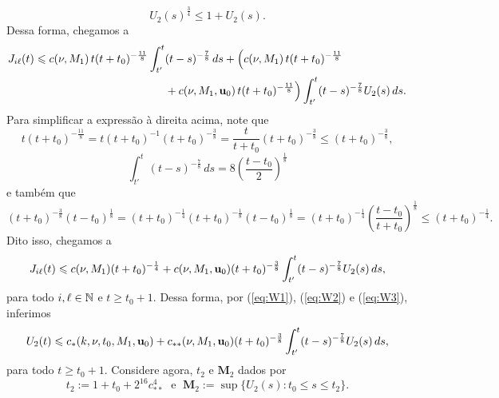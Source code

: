 \begin{prf}
    \begin{equation} \label{eq:youngu2}
        U_2(s)^{\frac{3}{4}} \leqslant 1 + U_2(s).
    \end{equation}
    Dessa forma, chegamos a
    \[
        \begin{aligned}
            J_{i\ell}(t) \leqslant c(\nu, M_1) \,t (t + t_0)^{-\frac{11}{8}} \int_{t'}^t &(t - s)^{-\frac{7}{8}} \,ds + \Big( c(\nu, M_1) \,t (t + t_0)^{-\frac{11}{8}}\\ 
            &+ c(\nu, M_1, \mathbf{u}_0) \, t (t + t_0)^{-\frac{11}{8}} \Big) \int_{t'}^t (t - s)^{-\frac{7}{8}} U_2(s) \,ds.
        \end{aligned}
    \]
    Para simplificar a expressão à direita acima, note que
    \begin{equation} \label{eq:mais1}
         t(t + t_0)^{-\frac{11}{8}} = t(t + t_0)^{-1} (t+t_0)^{-\frac{3}{8}} = \frac{t}{t + t_0} (t + t_0)^{-\frac{3}{8}} \leqslant (t + t_0)^{-\frac{3}{8}},
    \end{equation}
    \begin{equation} \label{eq:mais2}
        \int_{t'}^t (t-s)^{-\frac{7}{8}} \,ds = 8 \left( \frac{t - t_0}{2} \right)^{\frac{1}{8}}
    \end{equation}
    e também que
    \begin{equation} \label{eq:mais3}
        (t + t_0)^{-\frac{3}{8}} (t - t_0)^{\frac{1}{8}} = (t + t_0)^{-\frac{1}{4}} (t + t_0)^{-\frac{1}{8}} (t - t_0)^{\frac{1}{8}} = (t + t_0)^{-\frac{1}{4}} \left( \frac{t - t_0}{t+t_0} \right)^{\frac{1}{8}} \leqslant (t + t_0)^{-\frac{1}{4}}.
    \end{equation}
    Dito isso, chegamos a
    \begin{equation} \label{eq:W3}
        J_{i\ell}(t) \leqslant c(\nu, M_1) (t + t_0)^{-\frac{1}{4}} + c(\nu,M_1, \mathbf{u}_0) (t+t_0)^{-\frac{3}{8}} \int_{t'}^t (t - s)^{-\frac{7}{8}} U_2(s)\,ds,
    \end{equation}
    para todo $i, \ell \in \mathbb{N}$ e $t \geqslant t_0 + 1$. Dessa forma, por (\ref{eq:W1}), (\ref{eq:W2}) e (\ref{eq:W3}), inferimos
    \begin{equation} \label{eq:4.13}
        U_2(t) \leqslant c_* (k, \nu, t_0, M_1, \mathbf{u}_0) + c_{**} (\nu, M_1, \mathbf{u}_0)(t + t_0)^{-\frac{3}{8}} \int_{t'}^t (t-s)^{-\frac{7}{8}} U_2(s) \,ds,
    \end{equation}
    para todo $ t \geqslant t_0 + 1$.
    Considere agora, $t_2$ e $\mathbf{M}_2$ dados por
    \[
        t_2 := 1 + t_0 + 2^{16}c_{**}^4 \;\text{ e }\; \mathbf{M}_2 := \sup \{ U_2(s) : t_0 \leqslant  s \leqslant t_2\}.
\]
\end{prf}
